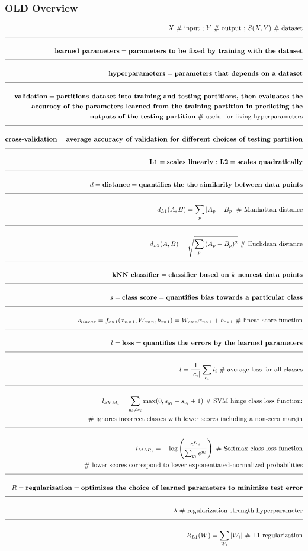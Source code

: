 \documentclass[a4paper]{article}
\newcommand{\eqComment}[1]{\text{  \# #1}}
\newcommand{\eqSep}{\text{ ;  }}
\newcommand{\n}{\\[1.5ex] \hline \nonumber \\[0ex]}
\newcommand{\m}{\nonumber \\}
\begin{document}
\subsubsection{OLD Overview} %
\begin{tcolorbox}
\begin{align}
   X \eqComment{input} \eqSep Y \eqComment{output} \eqSep S(X, Y) \eqComment{dataset}
\n \textbf{learned parameters} = \textbf{parameters to be fixed by training with the dataset}
\n \textbf{hyperparameters} = \textbf{parameters that depends on a dataset}
\n \textbf{validation} = \textbf{partitions dataset into training and testing partitions, then evaluates the}
\m \textbf{accuracy of the parameters learned from the training partition in predicting the}
\m \textbf{outputs of the testing partition} \eqComment{useful for fixing hyperparameters}
\n \textbf{cross-validation} = \textbf{average accuracy of validation for different choices of testing partition}
\n \textbf{L1} = \textbf{scales linearly} \eqSep \textbf{L2} = \textbf{scales quadratically}
\n d = \textbf{distance} = \textbf{quantifies the the similarity between data points}
\n d_{L1}(A, B) = \sum_p{|A_p - B_p|} \eqComment{Manhattan distance}
\n d_{L2}(A, B) = \sqrt{\sum_p{(A_p - B_p)^2}} \eqComment{Euclidean distance}
\n \textbf{kNN classifier} = \textbf{classifier based on $k$ nearest data points} 
\n s = \textbf{class score} = \textbf{quantifies bias towards a particular class}
\n s_{linear} = f_{c \times 1}(x_{n \times 1}, W_{c \times n}, b_{c \times 1}) = W_{c \times n} x_{n \times 1} + b_{c \times 1} \eqComment{linear score function}
\n l = \textbf{loss} = \textbf{quantifies the errors by the learned parameters}
\n l = \frac{1}{|c_i|} \sum_{c_i} l_i \eqComment{average loss for all classes}
\n l_{SVM_i} =  \sum_{y_i \neq c_i} \max(0, s_{y_i} - s_{c_i} + 1) \eqComment{SVM hinge class loss function:}
\m \eqComment{ignores incorrect classes with lower scores including a non-zero margin}
\n l_{MLR_i} = -\log\left(\frac{e^{s_{c_i}}}{\sum_{y_i} e^{y_i}}\right) \eqComment{Softmax class loss function}
\m \eqComment{lower scores correspond to lower exponentiated-normalized probabilities}
\n R = \textbf{regularization} = \textbf{optimizes the choice of learned parameters to minimize test error}
\n \lambda \eqComment{regularization strength hyperparameter}
\n R_{L1}(W) = \sum_{W_i} |W_i| \eqComment{L1 regularization}

\end{align}
\end{tcolorbox}
\end{document}
